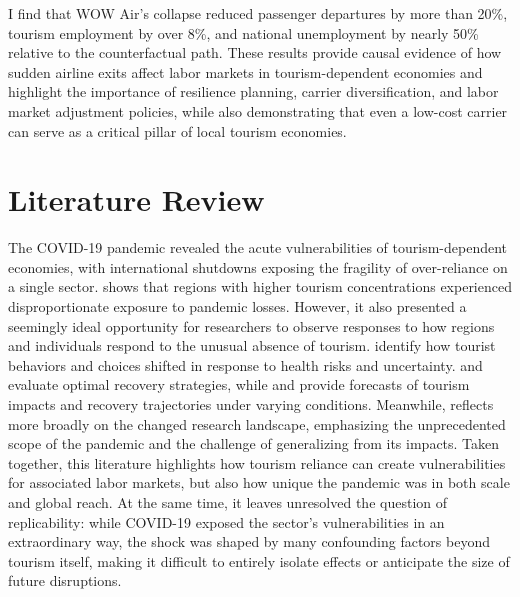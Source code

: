 \documentclass[12pt]{article}
\begin{document}
I find that WOW Air’s collapse reduced passenger departures by more than 20\%, tourism employment by over 8\%, and national unemployment by nearly 50\% relative to the counterfactual path. These results provide causal evidence of how sudden airline exits affect labor markets in tourism-dependent economies and highlight the importance of resilience planning, carrier diversification, and labor market adjustment policies, while also demonstrating that even a low-cost carrier can serve as a critical pillar of local tourism economies.

\section{Literature Review}\label{sec:Literature}
The COVID-19 pandemic revealed the acute vulnerabilities of tourism-dependent economies, with international shutdowns exposing the fragility of over-reliance on a single sector. \citet{duro_2021_covid19} shows that regions with higher tourism concentrations experienced disproportionate exposure to pandemic losses. However, it also presented a seemingly ideal opportunity for researchers to observe responses to how regions and individuals respond to the unusual absence of tourism.  \citet{jczmyk_2023_impact} identify how tourist behaviors and choices shifted in response to health risks and uncertainty. \citet{yeh_2020_tourism} and \citet{kreiner_2020_national} evaluate optimal recovery strategies, while \citet{fotiadis_2021_the} and \citet{kare_2020_impact} provide forecasts of tourism impacts and recovery trajectories under varying conditions. Meanwhile, \citet{sigala_2020_tourism} reflects more broadly on the changed research landscape, emphasizing the unprecedented scope of the pandemic and the challenge of generalizing from its impacts. Taken together, this literature highlights how tourism reliance can create vulnerabilities for associated labor markets, but also how unique the pandemic was in both scale and global reach. At the same time, it leaves unresolved the question of replicability: while COVID-19 exposed the sector’s vulnerabilities in an extraordinary way, the shock was shaped by many confounding factors beyond tourism itself, making it difficult to entirely isolate effects or anticipate the size of future disruptions.
\end{document}
